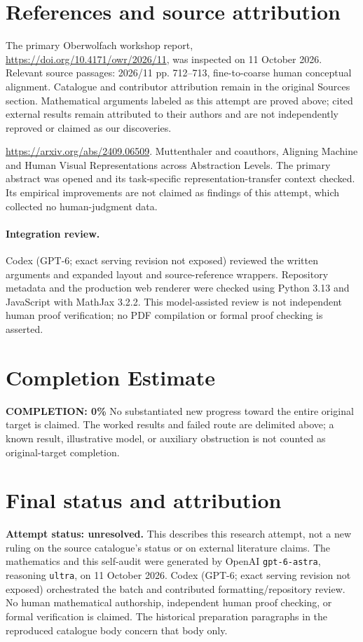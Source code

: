 \documentclass[11pt]{article}
\begin{document}
\section{References and source attribution}
The primary Oberwolfach workshop report, \url{https://doi.org/10.4171/owr/2026/11}, was inspected on 11 October 2026. Relevant source passages: 2026/11 pp. 712--713, fine-to-coarse human conceptual alignment. Catalogue and contributor attribution remain in the original Sources section. Mathematical arguments labeled as this attempt are proved above; cited external results remain attributed to their authors and are not independently reproved or claimed as our discoveries.

\url{https://arxiv.org/abs/2409.06509}. Muttenthaler and coauthors, Aligning Machine and Human Visual Representations across Abstraction Levels. The primary abstract was opened and its task-specific representation-transfer context checked. Its empirical improvements are not claimed as findings of this attempt, which collected no human-judgment data.


\paragraph{Integration review.} Codex (GPT-6; exact serving revision not exposed) reviewed the written arguments and expanded layout and source-reference wrappers. Repository metadata and the production web renderer were checked using Python 3.13 and JavaScript with MathJax 3.2.2. This model-assisted review is not independent human proof verification; no PDF compilation or formal proof checking is asserted.

\section{Completion Estimate}
\noindent\textbf{COMPLETION: 0\%}
No substantiated new progress toward the entire original target is claimed. The worked results and failed route are delimited above; a known result, illustrative model, or auxiliary obstruction is not counted as original-target completion.

\section{Final status and attribution}
\textbf{Attempt status: unresolved.} This describes this research attempt, not a new ruling on the source catalogue's status or on external literature claims.
The mathematics and this self-audit were generated by OpenAI \texttt{gpt-6-astra}, reasoning \texttt{ultra}, on 11 October 2026. Codex (GPT-6; exact serving revision not exposed) orchestrated the batch and contributed formatting/repository review. No human mathematical authorship, independent human proof checking, or formal verification is claimed. The historical preparation paragraphs in the reproduced catalogue body concern that body only.
\end{document}
